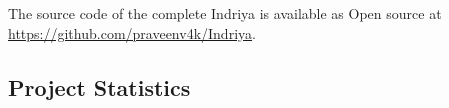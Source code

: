 The source code of the complete Indriya is available as Open source at \url{https://github.com/praveenv4k/Indriya}. 
\subsection{Project Statistics}

